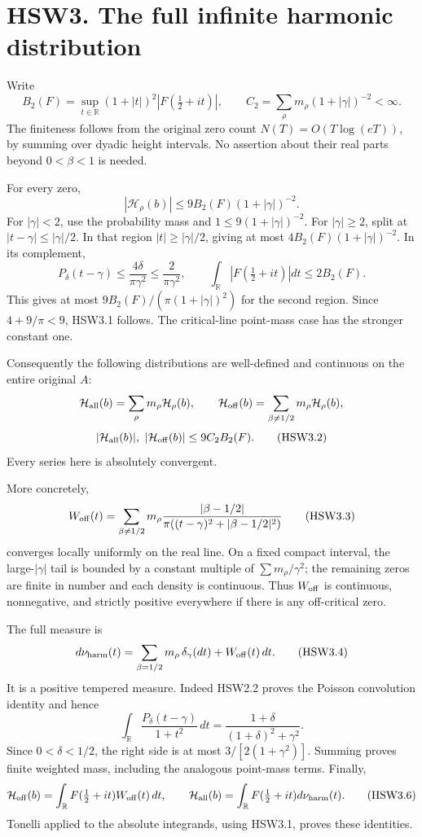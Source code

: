 \section{HSW3. The full infinite harmonic
distribution}\label{hsw3.-the-full-infinite-harmonic-distribution}

Write \[
B_2(F)=\sup_{t\in\mathbb R}(1+|t|)^2|F(\tfrac12+it)|,\qquad
C_2=\sum_\rho m_\rho(1+|\gamma|)^{-2}<\infty.
\] The finiteness follows from the original zero count
\(N(T)=O(T\log(eT))\), by summing over dyadic height intervals. No
assertion about their real parts beyond \(0<\beta<1\) is needed.

For every zero, \[
|\mathcal H_\rho(b)|\le9B_2(F)(1+|\gamma|)^{-2}.
\tag{HSW3.1}
\] For \(|\gamma|<2\), use the probability mass and
\(1\le9(1+|\gamma|)^{-2}\). For \(|\gamma|\ge2\), split at
\(|t-\gamma|\le|\gamma|/2\). In that region \(|t|\ge|\gamma|/2\), giving
at most \(4B_2(F)(1+|\gamma|)^{-2}\). In its complement, \[
P_\delta(t-\gamma)\le\frac{4\delta}{\pi\gamma^2}
\le\frac2{\pi\gamma^2},\qquad
\int_{\mathbb R}|F(\tfrac12+it)|dt\le2B_2(F).
\] This gives at most \(9B_2(F)/(\pi(1+|\gamma|)^2)\) for the second
region. Since \(4+9/\pi<9\), HSW3.1 follows. The critical-line
point-mass case has the stronger constant one.

Consequently the following distributions are well-defined and continuous
on the entire original \(A\): \[
\mathcal H_{\rm all}(b)=\sum_\rho m_\rho\mathcal H_\rho(b),\qquad
\mathcal H_{\rm off}(b)=\sum_{\beta\ne1/2}m_\rho\mathcal H_\rho(b),
\] \[
|\mathcal H_{\rm all}(b)|,\ |\mathcal H_{\rm off}(b)|
\le9C_2B_2(F).
\tag{HSW3.2}
\] Every series here is absolutely convergent.

More concretely, \[
W_{\rm off}(t)=
\sum_{\beta\ne1/2}
m_\rho\frac{|\beta-1/2|}
{\pi((t-\gamma)^2+|\beta-1/2|^2)}
\tag{HSW3.3}
\] converges locally uniformly on the real line. On a fixed compact
interval, the large-\(|\gamma|\) tail is bounded by a constant multiple
of \(\sum m_\rho/\gamma^2\); the remaining zeros are finite in number
and each density is continuous. Thus \(W_{\rm off}\) is continuous,
nonnegative, and strictly positive everywhere if there is any
off-critical zero.

The full measure is \[
d\nu_{\rm harm}(t)=
\sum_{\beta=1/2}m_\rho\,\delta_\gamma(dt)
+W_{\rm off}(t)\,dt.
\tag{HSW3.4}
\] It is a positive tempered measure. Indeed HSW2.2 proves the Poisson
convolution identity and hence \[
\int_{\mathbb R}\frac{P_\delta(t-\gamma)}{1+t^2}\,dt
=\frac{1+\delta}{(1+\delta)^2+\gamma^2}.
\tag{HSW3.5}
\] Since \(0<\delta<1/2\), the right side is at most
\(3/[2(1+\gamma^2)]\). Summing proves finite weighted mass, including
the analogous point-mass terms. Finally, \[
\mathcal H_{\rm off}(b)=\int_{\mathbb R}F(\tfrac12+it)W_{\rm off}(t)\,dt,\qquad
\mathcal H_{\rm all}(b)=\int_{\mathbb R}F(\tfrac12+it)d\nu_{\rm harm}(t).
\tag{HSW3.6}
\] Tonelli applied to the absolute integrands, using HSW3.1, proves
these identities.

